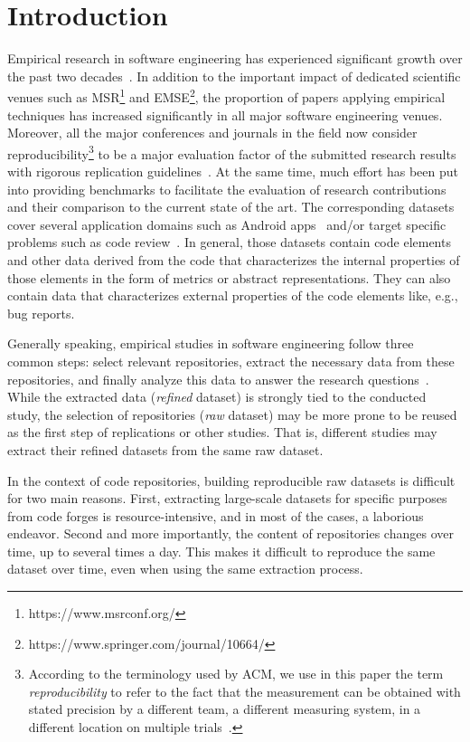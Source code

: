 \section{Introduction}
\label{introduction}

Empirical research in software engineering has experienced significant growth over the past two decades~\cite{zhang2018empirical}. In addition to the important impact of dedicated scientific venues such as MSR\footnote{https://www.msrconf.org/} and EMSE\footnote{https://www.springer.com/journal/10664/}, the proportion of papers applying empirical techniques has increased significantly in all  major software engineering venues.
Moreover, all the major conferences and journals in the field now consider reproducibility\footnote{According to the terminology used by ACM, we use in this paper the term \emph{reproducibility} to refer to the fact that the measurement can be obtained with stated precision by a different team, a different measuring system, in a different location on multiple trials~\cite{barba2018terminologies}.} to be a major evaluation factor of the submitted research results with rigorous replication guidelines~\cite{shull2008role, juristo2012replication, da2014replication}.
At the same time, much effort has been put into providing benchmarks to facilitate the evaluation of research contributions and their comparison to the current state of the art. The corresponding datasets cover several application domains such as Android apps~\cite{allix2016androzoo} and/or target specific problems such as code review~\cite{wang2021can}. In general, those datasets contain code elements and other data derived from the code that characterizes the internal properties of those elements in the form of metrics or abstract representations. They can also contain data that characterizes external properties of the code elements like, e.g., bug reports.

Generally speaking, empirical studies in software engineering follow three common steps: select relevant repositories, extract the necessary data from these repositories, and finally analyze this data to answer the research questions~\cite{vidoni2022systematic}. 
While the extracted data (\textit{refined} dataset) is strongly tied to the conducted study, the selection of repositories (\textit{raw} dataset) may be more prone to be reused as the first step of replications or other studies.
That is, different studies may extract their refined datasets from the same raw dataset.

In the context of code repositories, building reproducible raw datasets is difficult for two main reasons. First, extracting large-scale datasets for specific purposes from code forges is resource-intensive, and in most of the cases, a laborious endeavor. 
Second and more importantly, the content of repositories changes over time, up to several times a day. This makes it difficult to reproduce the same dataset over time, even when using the same extraction process.

